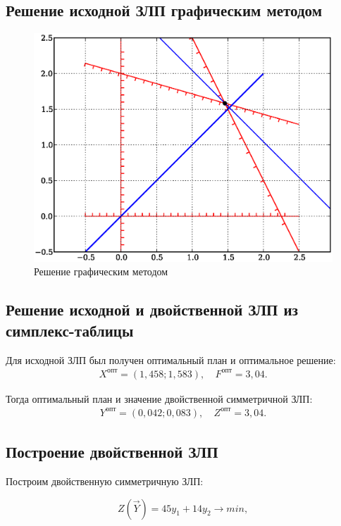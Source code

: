 \subsection{Решение исходной ЗЛП графическим методом}
\begin{figure}[ht]
\centering
\includegraphics[width=\textwidth]{img/11}
\caption{Решение графическим методом}\label{11}
\end{figure}

\subsection{Решение исходной и двойственной ЗЛП из симплекс-таблицы}
Для исходной ЗЛП был получен оптимальный план и оптимальное решение:
\begin{align*}
	X^{опт} = (1,458;1,583),&~ F^{опт} = 3,04.
\end{align*}


Тогда оптимальный план и значение двойственной симметричной ЗЛП:
\begin{align*}
	Y^{опт} = (0,042; 0,083),&~ Z^{опт} = 3,04.
\end{align*}

\subsection{Построение двойственной ЗЛП}
Построим двойственную симметричную ЗЛП:

\begin{equation}
	Z(\vec{Y}) = 45 y_1 + 14y_2 \to min,
\end{equation}

